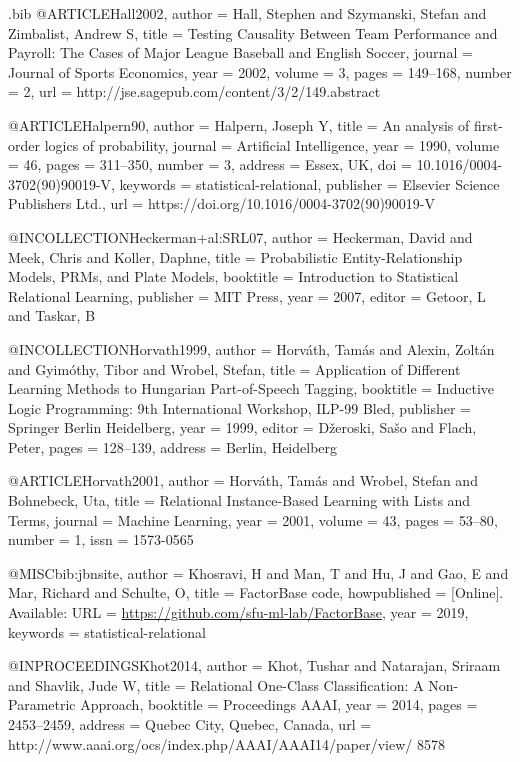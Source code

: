 {\begin{filecontents}{\jobname.bib}
@ARTICLE{Hall2002,
  author = {Hall, Stephen and Szymanski, Stefan and Zimbalist, Andrew S},
  title = {{Testing Causality Between Team Performance and Payroll: The Cases
	of Major League Baseball and English Soccer}},
  journal = {Journal of Sports Economics},
  year = {2002},
  volume = {3},
  pages = {149--168},
  number = {2},
  url = {http://jse.sagepub.com/content/3/2/149.abstract}
}

@ARTICLE{Halpern90,
  author = {Halpern, Joseph Y},
  title = {{An analysis of first-order logics of probability}},
  journal = {Artificial Intelligence},
  year = {1990},
  volume = {46},
  pages = {311--350},
  number = {3},
  address = {Essex, UK},
  doi = {10.1016/0004-3702(90)90019-V},
  keywords = {statistical-relational},
  publisher = {Elsevier Science Publishers Ltd.},
  url = {https://doi.org/10.1016/0004-3702(90)90019-V}
}

@INCOLLECTION{Heckerman+al:SRL07,
  author = {Heckerman, David and Meek, Chris and Koller, Daphne},
  title = {Probabilistic Entity-Relationship Models, {PRMs}, and Plate
	Models},
  booktitle = {Introduction to Statistical Relational Learning},
  publisher = {MIT Press},
  year = {2007},
  editor = {Getoor, L and Taskar, B}
}

@INCOLLECTION{Horvath1999,
  author = {Horv{\'{a}}th, Tam{\'{a}}s and Alexin, Zolt{\'{a}}n and Gyim{\'{o}}thy,
	Tibor and Wrobel, Stefan},
  title = {Application of Different Learning Methods to Hungarian Part-of-Speech
	Tagging},
  booktitle = {Inductive Logic Programming: 9th International Workshop, ILP-99 Bled},
  publisher = {Springer Berlin Heidelberg},
  year = {1999},
  editor = {D{\v{z}}eroski, Sa{\v{s}}o and Flach, Peter},
  pages = {128--139},
  address = {Berlin, Heidelberg}
}

@ARTICLE{Horvath2001,
  author = {Horv{\'{a}}th, Tam{\'{a}}s and Wrobel, Stefan and Bohnebeck, Uta},
  title = {{Relational Instance-Based Learning with Lists and Terms}},
  journal = {Machine Learning},
  year = {2001},
  volume = {43},
  pages = {53--80},
  number = {1},
  issn = {1573-0565}
}

@MISC{bib:jbnsite,
  author = {Khosravi, H and Man, T and Hu, J and Gao, E and Mar, Richard and
	Schulte, O},
  title = {FactorBase code},
  howpublished = {[Online]. Available: URL = \url{https://github.com/sfu-ml-lab/FactorBase}},
  year = {2019},
  keywords = {statistical-relational}
}

@INPROCEEDINGS{Khot2014,
  author = {Khot, Tushar and Natarajan, Sriraam and Shavlik, Jude W},
  title = {Relational One-Class Classification: A Non-Parametric Approach},
  booktitle = {Proceedings AAAI},
  year = {2014},
  pages = {2453--2459},
  address = {Quebec City, Quebec, Canada},
  url = {http://www.aaai.org/ocs/index.php/AAAI/AAAI14/paper/view/ 8578}
}


\end{filecontents}}
